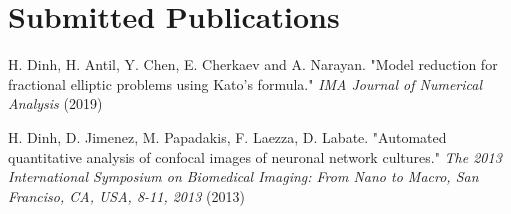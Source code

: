 \newcommand{\arxiv}[1]{[\href{http://arxiv.org/abs/#1}{arXiv:#1}]}


\setcounter{numPubs}{1}
\setcounter{pubCounter}{\value{numPubs}}


\section{\sc Submitted Publications}
\begin{etaremune}[start=\value{pubCounter}]
 \item[ ]
  H. Dinh, H. Antil, Y. Chen, E. Cherkaev and A. Narayan. "Model reduction for fractional elliptic problems using Kato's formula." {\it IMA Journal of Numerical Analysis} (2019)

  \item[ ] H. Dinh, D. Jimenez, M. Papadakis, F. Laezza, D. Labate. "Automated quantitative analysis of confocal images of neuronal network cultures." {\it The 2013 International Symposium on Biomedical Imaging: From Nano to Macro, San Franciso, CA, USA, 8-11, 2013} (2013)
\end{etaremune}



